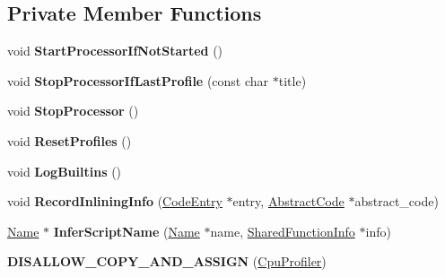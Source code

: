 \subsection*{Private Member Functions}
\begin{DoxyCompactItemize}
\item 
void {\bfseries Start\+Processor\+If\+Not\+Started} ()\hypertarget{classv8_1_1internal_1_1_cpu_profiler_a01985bb8f0531b992dc3017abe100358}{}\label{classv8_1_1internal_1_1_cpu_profiler_a01985bb8f0531b992dc3017abe100358}

\item 
void {\bfseries Stop\+Processor\+If\+Last\+Profile} (const char $\ast$title)\hypertarget{classv8_1_1internal_1_1_cpu_profiler_a32991ec103f18bda147843a73dc48b70}{}\label{classv8_1_1internal_1_1_cpu_profiler_a32991ec103f18bda147843a73dc48b70}

\item 
void {\bfseries Stop\+Processor} ()\hypertarget{classv8_1_1internal_1_1_cpu_profiler_ae5dd3f2c459b2853ef0c5f899d58aea5}{}\label{classv8_1_1internal_1_1_cpu_profiler_ae5dd3f2c459b2853ef0c5f899d58aea5}

\item 
void {\bfseries Reset\+Profiles} ()\hypertarget{classv8_1_1internal_1_1_cpu_profiler_a8a2e3200a3b65dcbcb7cf0dc919896a5}{}\label{classv8_1_1internal_1_1_cpu_profiler_a8a2e3200a3b65dcbcb7cf0dc919896a5}

\item 
void {\bfseries Log\+Builtins} ()\hypertarget{classv8_1_1internal_1_1_cpu_profiler_af43bcd9d61d5b2ae94aa1c03f4c0fe9f}{}\label{classv8_1_1internal_1_1_cpu_profiler_af43bcd9d61d5b2ae94aa1c03f4c0fe9f}

\item 
void {\bfseries Record\+Inlining\+Info} (\hyperlink{classv8_1_1internal_1_1_code_entry}{Code\+Entry} $\ast$entry, \hyperlink{classv8_1_1internal_1_1_abstract_code}{Abstract\+Code} $\ast$abstract\+\_\+code)\hypertarget{classv8_1_1internal_1_1_cpu_profiler_a901b14869ec4c54925cd3bd7bbcdda08}{}\label{classv8_1_1internal_1_1_cpu_profiler_a901b14869ec4c54925cd3bd7bbcdda08}

\item 
\hyperlink{classv8_1_1internal_1_1_name}{Name} $\ast$ {\bfseries Infer\+Script\+Name} (\hyperlink{classv8_1_1internal_1_1_name}{Name} $\ast$name, \hyperlink{classv8_1_1internal_1_1_shared_function_info}{Shared\+Function\+Info} $\ast$info)\hypertarget{classv8_1_1internal_1_1_cpu_profiler_a7e51d247e4c93ed71059a0875f2b65a4}{}\label{classv8_1_1internal_1_1_cpu_profiler_a7e51d247e4c93ed71059a0875f2b65a4}

\item 
{\bfseries D\+I\+S\+A\+L\+L\+O\+W\+\_\+\+C\+O\+P\+Y\+\_\+\+A\+N\+D\+\_\+\+A\+S\+S\+I\+GN} (\hyperlink{classv8_1_1internal_1_1_cpu_profiler}{Cpu\+Profiler})\hypertarget{classv8_1_1internal_1_1_cpu_profiler_a7efa8fdcf5c1d23cc8a70fdf65e0217d}{}\label{classv8_1_1internal_1_1_cpu_profiler_a7efa8fdcf5c1d23cc8a70fdf65e0217d}

\end{DoxyCompactItemize}
